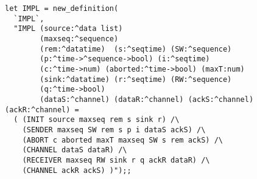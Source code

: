 \begin{session}
\begin{verbatim}
let IMPL = new_definition(
  `IMPL`,
  "IMPL (source:^data list)
        (maxseq:^sequence) 
        (rem:^datatime)  (s:^seqtime) (SW:^sequence)
        (p:^time->^sequence->bool) (i:^seqtime)
        (c:^time->num) (aborted:^time->bool) (maxT:num)
        (sink:^datatime) (r:^seqtime) (RW:^sequence)
        (q:^time->bool)
        (dataS:^channel) (dataR:^channel) (ackS:^channel) (ackR:^channel) =
  ( (INIT source maxseq rem s sink r) /\
    (SENDER maxseq SW rem s p i dataS ackS) /\
    (ABORT c aborted maxT maxseq SW s rem ackS) /\
    (CHANNEL dataS dataR) /\
    (RECEIVER maxseq RW sink r q ackR dataR) /\
    (CHANNEL ackR ackS) )");;
\end{verbatim}
\end{session}

